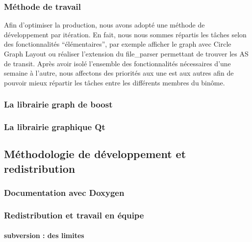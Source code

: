 \subsubsection{Méthode de travail}

Afin d'optimiser la production, nous avons adopté une méthode de développement par itération. En fait, nous nous sommes répartis les tâches selon des fonctionnalités ``élémentaires'', par exemple afficher le graph avec Circle Graph Layout ou réaliser l'extension du file\_parser permettant de trouver les AS de transit. Après avoir isolé l'ensemble des fonctionnalités nécessaires d'une semaine à l'autre, nous affectons des priorités aux une est aux autres afin de pouvoir mieux répartir les tâches entre les différents membres du binôme.

\subsubsection{La librairie graph de boost}



\subsubsection{La librairie graphique Qt}


\subsection{Méthodologie de développement et redistribution}
\subsubsection{Documentation avec Doxygen}


\subsubsection{Redistribution et travail en équipe}
\paragraph{subversion : des limites}

